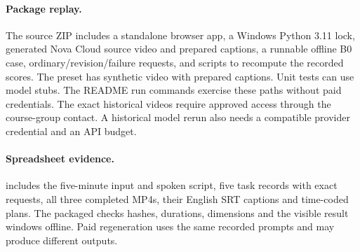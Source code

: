 \paragraph{Package replay.}
The source ZIP includes a standalone browser app, a Windows Python 3.11 lock, generated Nova Cloud source video and prepared captions, a runnable offline B0 case, ordinary/revision/failure requests, and scripts to recompute the recorded scores. The preset has synthetic video with prepared captions. Unit tests can use model stubs. The README run commands exercise these paths without paid credentials. The exact historical videos require approved access through the course-group contact. A historical model rerun also needs a compatible provider credential and an API budget.

\paragraph{Spreadsheet evidence.}
 includes the five-minute input and spoken script, five task records with exact requests, all three completed MP4s, their English SRT captions and time-coded plans. The packaged  checks hashes, durations, dimensions and the visible result windows offline. Paid regeneration uses the same recorded prompts and may produce different outputs.

